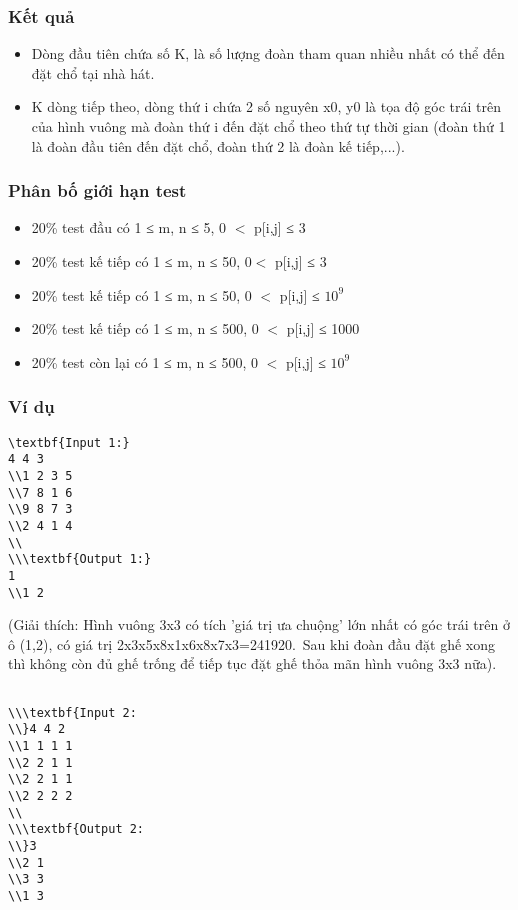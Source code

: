 \subsubsection{   Kết quả  }
\begin{itemize}
	\item     Dòng đầu tiên chứa số K, là số lượng đoàn tham quan nhiều nhất có thể đến đặt chổ tại nhà hát.   
	\item     K dòng tiếp theo, dòng thứ i chứa 2 số nguyên x0, y0 là tọa độ góc trái trên của hình vuông mà đoàn thứ i đến đặt chổ theo thứ tự thời gian (đoàn thứ 1 là đoàn đầu tiên đến đặt chổ, đoàn thứ 2 là đoàn kế tiếp,...).   
\end{itemize}

\subsubsection{   Phân bố giới hạn test  }
\begin{itemize}
	\item     20\% test đầu có 1 ≤ m, n ≤ 5, 0 $<$ p[i,j] ≤ 3   
	\item     20\% test kế tiếp có 1 ≤ m, n ≤ 50, 0$<$ p[i,j] ≤ 3   
	\item     20\% test kế tiếp có 1 ≤ m, n ≤ 50, 0 $<$ p[i,j] ≤ $10^{9}$
	\item     20\% test kế tiếp có 1 ≤ m, n ≤ 500, 0 $<$ p[i,j] ≤ 1000   
	\item     20\% test còn lại có 1 ≤ m, n ≤ 500, 0 $<$ p[i,j] ≤ $10^{9}$
\end{itemize}

\subsubsection{   Ví dụ  }
\begin{verbatim}
\textbf{Input 1:}
4 4 3
\\1 2 3 5
\\7 8 1 6
\\9 8 7 3
\\2 4 1 4
\\
\\\textbf{Output 1:}
1
\\1 2\end{verbatim}

   (Giải thích: Hình vuông 3x3 có tích 'giá trị ưa chuộng' lớn nhất có góc trái trên ở ô (1,2), có giá trị 2x3x5x8x1x6x8x7x3=241920. Sau khi đoàn đầu đặt ghế xong thì không còn đủ ghế trống để tiếp tục đặt ghế thỏa mãn hình vuông 3x3 nữa).  
\begin{verbatim}

\\\textbf{Input 2:
\\}4 4 2
\\1 1 1 1
\\2 2 1 1
\\2 2 1 1
\\2 2 2 2
\\
\\\textbf{Output 2:
\\}3
\\2 1
\\3 3
\\1 3\end{verbatim}


